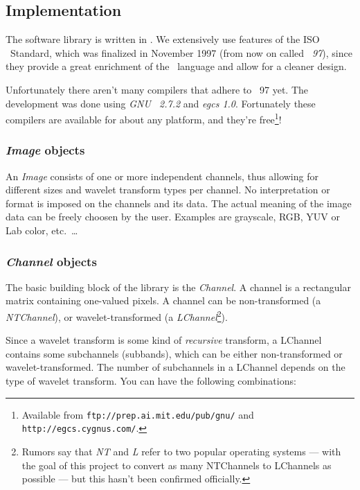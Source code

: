 \subsection{Implementation}

The software library is written in \CC. We extensively use features of the
ISO \CC\ Standard, which was finalized in November 1997 (from now on called
\emph{\CC\ 97}), since they provide a great enrichment of the \CC\ language and
allow for a cleaner design.

Unfortunately there aren't many compilers that adhere to \CC\ 97 yet. The
development was done using \emph{GNU \CC\ 2.7.2} and \emph{egcs 1.0}.
Fortunately these compilers are available for about any platform, and they're
free\footnote{Available from \texttt{ftp://prep.ai.mit.edu/pub/gnu/} and
\texttt{http://egcs.cygnus.com/}.}!


\subsubsection{\emph{Image} objects}

An \emph{Image} consists of one or more independent channels, thus allowing for
different sizes and wavelet transform types per channel. No interpretation or
format is imposed on the channels and its data. The actual meaning of the
image data can be freely choosen by the user. Examples are grayscale, RGB, YUV
or Lab color, etc.\ \ldots


\subsubsection{\emph{Channel} objects}

The basic building block of the library is the \emph{Channel}. A channel is a
rectangular matrix containing one-valued pixels. A channel can be
non-transformed (a \emph{NTChannel}), or wavelet-transformed (a
\emph{LChannel}\footnote{Rumors say that \emph{NT} and \emph{L} refer to
two popular operating systems --- with the goal of this project to convert as
many NTChannels to LChannels as possible --- but this hasn't been confirmed
officially.}).

Since a wavelet transform is some kind of \emph{recursive} transform, a
LChannel contains some subchannels (subbands), which can be either
non-transformed or wavelet-transformed. The number of subchannels in a LChannel
depends on the type of wavelet transform. You can have the following
combinations:

